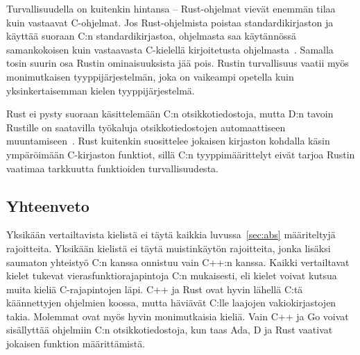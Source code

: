 Turvallisuudella on kuitenkin hintansa -- Rust-ohjelmat vievät enemmän tilaa
kuin vastaavat C-ohjelmat. Jos Rust-ohjelmista poistaa standardikirjaston ja
käyttää suoraan C:n standardikirjastoa, ohjelmasta saa käytännössä
samankokoisen kuin vastaavasta C-kielellä kirjoitetusta
ohjelmasta~\citep{rustbinarysize}. Samalla tosin suurin osa Rustin
ominaisuuksista jää pois. Rustin turvallisuus vaatii myös monimutkaisen
tyyppijärjestelmän, joka on vaikeampi opetella kuin yksinkertaisemman kielen
tyyppijärjestelmä.

Rust ei pysty suoraan käsittelemään C:n otsikkotiedostoja, mutta D:n tavoin
Rustille on saatavilla työkaluja otsikkotiedostojen automaattiseen
muuntamiseen~\citep{rustbindgen}. Rust kuitenkin suosittelee jokaisen kirjaston
kohdalla käsin ympäröimään C-kirjaston funktiot, sillä C:n tyyppimäärittelyt
eivät tarjoa Rustin vaatimaa tarkkuutta funktioiden turvallisuudesta.

\subsection{Yhteenveto}

Yksikään vertailtavista kielistä ei täytä kaikkia luvussa~\ref{sec:abs}
määriteltyjä rajoitteita. Yksikään kielistä ei täytä muistinkäytön rajoitteita,
jonka lisäksi saumaton yhteistyö C:n kanssa onnistuu vain C++:n
kanssa. Kaikki vertailtavat kielet tukevat vierasfunktiorajapintoja C:n
mukaisesti, eli kielet voivat kutsua muita kieliä C-rajapintojen läpi.
C++ ja Rust ovat hyvin lähellä C:tä käännettyjen ohjelmien koossa, mutta
häviävät C:lle laajojen vakiokirjastojen takia. Molemmat ovat myös hyvin
monimutkaisia kieliä. Vain C++ ja Go voivat sisällyttää ohjelmiin C:n
otsikkotiedostoja, kun taas Ada, D ja Rust vaativat jokaisen funktion
määrittämistä. 

